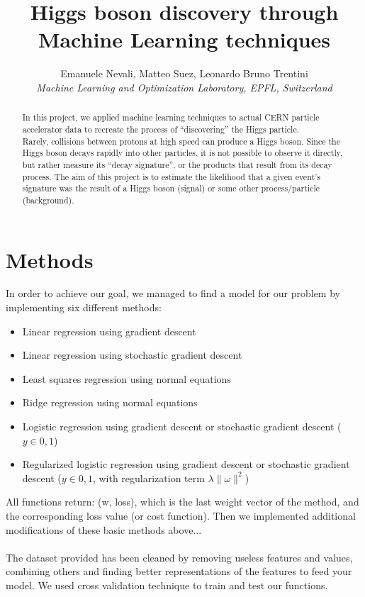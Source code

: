 \documentclass[10pt,conference,compsocconf]{IEEEtran}
\begin{document}
\title{Higgs boson discovery through Machine Learning techniques}

\author{
  Emanuele Nevali, Matteo Suez, Leonardo Bruno Trentini\\
  \textit{Machine Learning and Optimization Laboratory, EPFL, Switzerland}
}

\maketitle

\begin{abstract}
In this project, we applied machine learning techniques to actual CERN particle accelerator data to recreate the process of
“discovering” the Higgs particle.\\
Rarely, collisions between protons at high speed can produce a Higgs boson. Since the Higgs boson decays rapidly into other particles, it is not possible to observe it directly, but rather measure its “decay signature”, or the products that result from its decay process. The aim of this project is to estimate the likelihood that a given event’s signature was the result of a Higgs boson (signal) or some other process/particle (background).\\
\end{abstract}

\section{Methods}
In order to achieve our goal, we managed to find a model for our problem by implementing six different methods:
\begin{itemize}
    \item Linear regression using gradient descent
    \item Linear regression using stochastic gradient descent
    \item Least squares regression using normal equations
    \item Ridge regression using normal equations
    \item Logistic regression using gradient descent or stochastic gradient descent ($y \in {0,1}$)
    \item Regularized logistic regression using gradient descent or stochastic gradient descent ($y \in {0,1}$, with regularization term $ \lambda  \| \omega \|^2$)
\end{itemize}
All functions return: (w, loss), which is the last weight vector of the
method, and the corresponding loss value (or cost function).
Then we implemented additional modifications of these basic methods above...\\
\vspace{0.1cm}\\
The dataset provided has been cleaned by removing useless features and values, combining others and finding
better representations of the features to feed your model. We used cross validation technique to train and test our functions.
\end{document}
